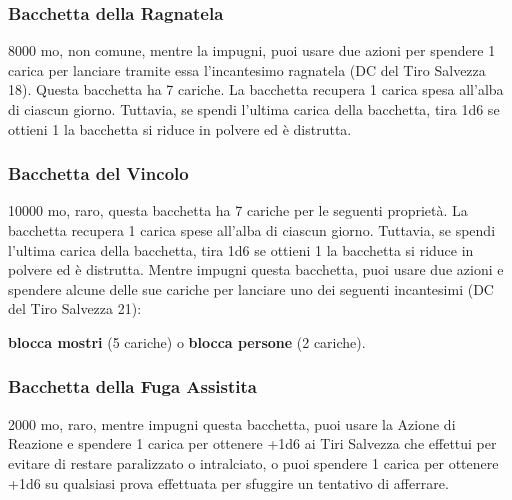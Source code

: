 \begin{multicols}{2}
	\subsubsection*{Bacchetta della Ragnatela}
	8000 mo, non comune, mentre la impugni, puoi usare due azioni per spendere 1 carica per lanciare tramite essa l'incantesimo ragnatela (DC del Tiro Salvezza 18). Questa bacchetta ha 7 cariche. La bacchetta recupera 1 carica spesa all'alba di ciascun giorno. Tuttavia, se spendi l'ultima carica della bacchetta, tira 1d6 se ottieni 1 la bacchetta si riduce in polvere ed è distrutta.

	\subsubsection*{Bacchetta del Vincolo}
	10000 mo, raro, questa bacchetta ha 7 cariche per le seguenti proprietà. La bacchetta recupera 1 carica spese all'alba di ciascun giorno. Tuttavia, se spendi l'ultima carica della bacchetta, tira 1d6 se ottieni 1 la bacchetta si riduce in polvere ed è distrutta. Mentre impugni questa bacchetta, puoi usare due azioni e spendere alcune delle sue cariche per lanciare uno dei seguenti incantesimi (DC del Tiro Salvezza 21):

	\textbf{blocca mostri} (5 cariche) o \textbf{blocca persone} (2 cariche).

	\subsubsection*{Bacchetta della Fuga Assistita}
	2000 mo, raro, mentre impugni questa bacchetta, puoi usare la Azione di Reazione e spendere 1 carica per ottenere +1d6 ai Tiri Salvezza che effettui per evitare di restare paralizzato o intralciato, o puoi spendere 1 carica per ottenere +1d6 su qualsiasi prova effettuata per sfuggire un tentativo di afferrare.


\end{multicols}
